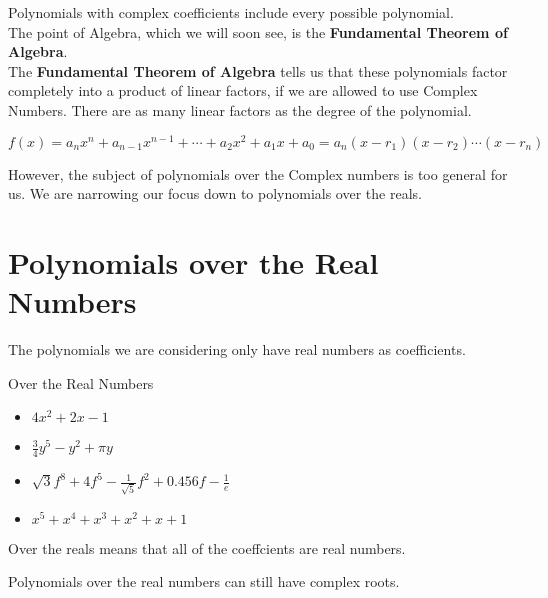 \documentclass{ximera}
\begin{document}
Polynomials with complex coefficients include every possible polynomial.  \\



The point of Algebra, which we will soon see, is the \textbf{Fundamental Theorem of Algebra}. \\



The \textbf{Fundamental Theorem of Algebra} tells us that these polynomials factor completely into a product of linear factors, if we are allowed to use Complex Numbers. There are as many linear factors as the degree of the polynomial.



\[   f(x) = a_n x^n + a_{n-1} x^{n-1} + \cdots + a_2 x^2 + a_1 x + a_0   =   a_n (x - r_1) (x - r_2) \cdots (x - r_n)  \]


However, the subject of polynomials over the Complex numbers is too general for us.  We are narrowing our focus down to polynomials over the reals.




\section{Polynomials over the Real Numbers}


The polynomials we are considering only have real numbers as coefficients.


\begin{example} Over the Real Numbers



\begin{itemize}
\item $4 x^2 + 2 x -1$
\item $\frac{3}{4} y^5 - y^2 + \pi y$
\item $\sqrt{3} f^8 + 4 f^5 - \frac{1}{\sqrt{5}} f^2 + 0.456 f - \frac{1}{e}$
\item $x^5 + x^4 + x^3 + x^2 + x + 1$
\end{itemize}



\end{example}






Over the reals means that all of the coeffcients are real numbers.



Polynomials over the real numbers can still have complex roots.
\end{document}

